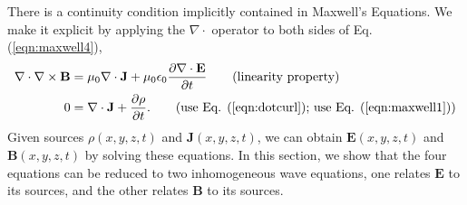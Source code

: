 \documentclass[11pt]{article}              %
\begin{document}
There is a continuity condition implicitly contained in Maxwell's Equations. We make it explicit by applying the $\nabla\cdot$ operator to both sides of Eq. (\ref{eqn:maxwell4}),
\begin{align}
    \nabla\cdot\nabla\times {\mathbf B}&=\mu_0\nabla\cdot{\mathbf J}+\mu_0\epsilon_0\frac{\partial \nabla\cdot{\mathbf E}}{\partial t}\tag{linearity property}\\
    0&=\nabla\cdot{\mathbf J}+\frac{\partial \rho}{\partial t}.\tag{use Eq. (\ref{eqn:dotcurl}); use Eq. (\ref{eqn:maxwell1})}
\end{align}
Given sources $\rho(x,y,z,t)$ and ${\mathbf J}(x,y,z,t)$, we can obtain ${\mathbf E}(x,y,z,t)$ and ${\mathbf B}(x,y,z,t)$ by solving these equations. In this section, we show that the four equations can be reduced to two inhomogeneous wave equations, one relates ${\mathbf E}$ to its sources, and the other relates ${\mathbf B}$ to its sources.
\end{document}
